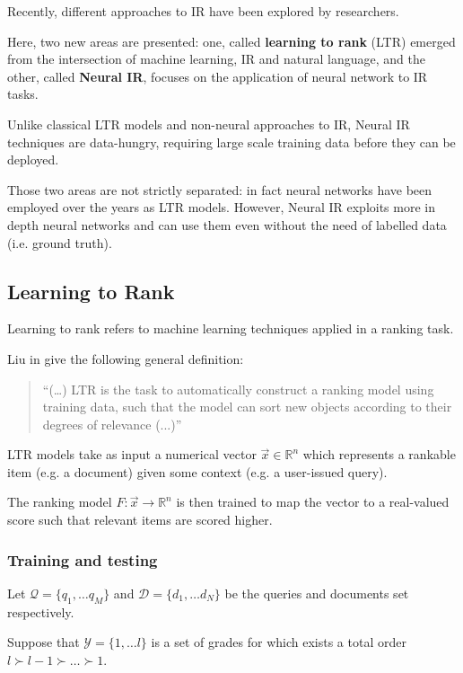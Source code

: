 Recently, different approaches to IR have been explored by researchers.

Here, two new areas are presented: one, called \textbf{learning to rank} (LTR) emerged from the intersection of machine learning, IR and natural language, and the other, called \textbf{Neural IR}, focuses on the application of neural network to IR tasks.

Unlike classical LTR models and non-neural approaches to IR, Neural IR techniques are data-hungry, requiring large scale training data before they can be deployed.

Those two areas are not strictly separated: in fact neural networks have been employed over the years as LTR models. However, Neural IR exploits more in depth neural networks and can use them even without the need of labelled data (i.e. ground truth).

\subsection{Learning to Rank}

Learning to rank refers to machine learning techniques applied in a ranking task.

Liu in \cite{learntorank} give the following general definition:

\begin{quote}
``(\dots) LTR is the task to automatically construct a ranking model using
training data, such that the model can sort new objects according to their
degrees of relevance (...)''
\end{quote}

LTR models take as input a numerical vector $ \vec{x} \in \mathbb{R}^n$ which represents a rankable item (e.g. a document) given some context (e.g.
a user-issued query).

The ranking model $F: \vec{x} \rightarrow \mathbb{R}^n$ is then trained to map the
vector to a real-valued score such that relevant items are scored higher.

\subsubsection{Training and testing}

Let $\mathcal{Q}=\{q_1, \dots q_M\}$ and $\mathcal{D} = \{d_1, \dots d_N\}$ be
the queries and documents set respectively.

Suppose that $\mathcal{Y} = \{1, \dots l\}$ is a set of grades for which exists
a total order $l \succ l-1 \succ \dots \succ 1$.

